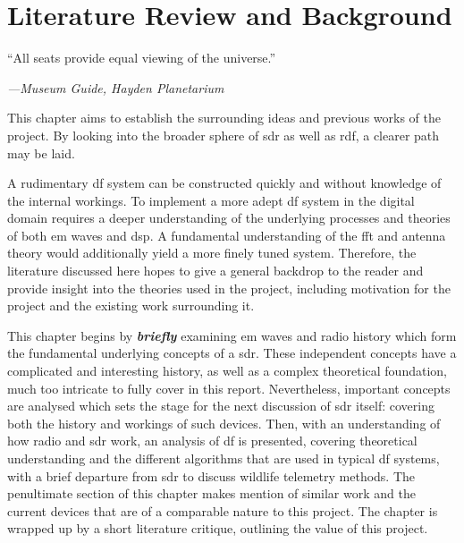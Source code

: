 \documentclass[class=report,11pt,crop=false]{standalone}
\begin{document}
\ifstandalone
\tableofcontents
\fi
\chapter{Literature Review and Background \label{ch:literature}}
\epigraph{``All seats provide equal viewing of the universe.''}
    {\emph{---Museum Guide, Hayden Planetarium}}
\vspace{0.5cm}
This chapter aims to establish the surrounding ideas and previous works of the project. By looking into the broader sphere of \gls{sdr} as well as \gls{rdf}, a clearer path may be laid.

A rudimentary \gls{df} system can be constructed quickly and without knowledge of the internal workings. To implement a more adept \gls{df} system in the digital domain requires a deeper understanding of the underlying processes and theories of both \gls{em} waves and \gls{dsp}. A fundamental understanding of the \gls{fft} and antenna theory would additionally yield a more finely tuned system.
Therefore, the literature discussed here hopes to give a general backdrop to the reader and provide insight into the theories used in the project, including motivation for the project and the existing work surrounding it.

This chapter begins by \textbf{\emph{briefly}} examining \gls{em} waves and radio history which form the fundamental underlying concepts of a \gls{sdr}. These independent concepts have a complicated and interesting history, as well as a complex theoretical foundation, much too intricate to fully cover in this report. Nevertheless, important concepts are analysed which sets the stage for the next discussion of \gls{sdr} itself: covering both the history and workings of such devices. Then, with an understanding of how radio and \gls{sdr} work, an analysis of \gls{df} is presented, covering theoretical understanding and the different algorithms that are used in typical \gls{df} systems, with a brief departure from \gls{sdr} to discuss wildlife telemetry methods. The penultimate section of this chapter makes mention of similar work and the current devices that are of a comparable nature to this project. The chapter is wrapped up by a short literature critique, outlining the value of this project. 

\end{document}
